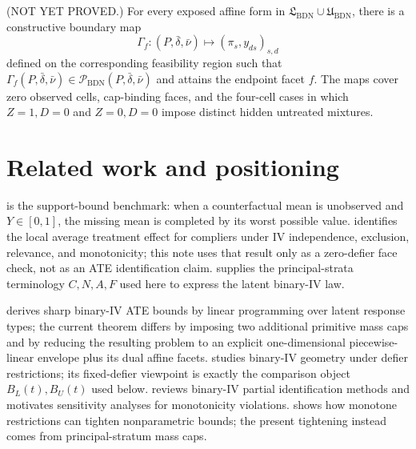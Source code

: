 \documentclass[11pt]{article}
\theoremstyle{definition}
\theoremstyle{plain}
\theoremstyle{remark}
\begin{document}
\begin{conjecture}\label{conj:boundary-certificates}
(NOT YET PROVED.)  For every exposed affine form in
\(\mathfrak{L}_{\mathrm{BDN}}\cup\mathfrak{U}_{\mathrm{BDN}}\), there is a
constructive boundary map
\[
\Gamma_f:(P,\bar\delta,\bar\nu)\mapsto(\pi_s,y_{ds})_{s,d}
\]
defined on the corresponding feasibility region such that
\(\Gamma_f(P,\bar\delta,\bar\nu)\in
\mathcal{P}_{\mathrm{BDN}}(P,\bar\delta,\bar\nu)\) and attains the endpoint
facet \(f\).  The maps cover zero observed cells, cap-binding faces, and the
four-cell cases in which \(Z=1,D=0\) and \(Z=0,D=0\) impose distinct hidden
untreated mixtures.
\end{conjecture}

\section{Related work and positioning}
\cite{Manski1990} is the support-bound benchmark: when a counterfactual mean is
unobserved and \(Y\in[0,1]\), the missing mean is completed by its worst
possible value.  \cite{ImbensAngrist1994} identifies the local average
treatment effect for compliers under IV independence, exclusion, relevance,
and monotonicity; this note uses that result only as a zero-defier face check,
not as an ATE identification claim.  \cite{AngristImbensRubin1996} supplies
the principal-strata terminology \(C,N,A,F\) used here to express the latent
binary-IV law.

\cite{BalkePearl1997} derives sharp binary-IV ATE bounds by linear programming
over latent response types; the current theorem differs by imposing two
additional primitive mass caps and by reducing the resulting problem to an
explicit one-dimensional piecewise-linear envelope plus its dual affine
facets.  \cite{RichardsonRobins2010}
studies binary-IV geometry under defier restrictions; its fixed-defier
viewpoint is exactly the comparison object \(B_L(t),B_U(t)\) used below.
\cite{SwansonHernanMillerRobinsRichardson2018} reviews binary-IV partial
identification methods and motivates sensitivity analyses for monotonicity
violations.  \cite{ManskiPepper2000} shows how monotone restrictions can
tighten nonparametric bounds; the present tightening instead comes from
principal-stratum mass caps.
\end{document}
